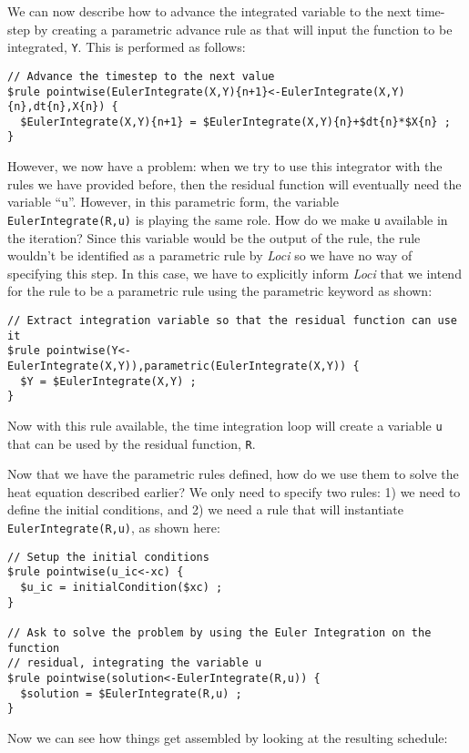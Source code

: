 \documentclass[10pt,epsf,letterpaper,twoside]{book}
\begin{document}
We can now describe how to advance the integrated variable to the next
time-step by creating a parametric advance rule as that will input the
function to be integrated, {\tt Y}.  This is performed as follows:
\begin{verbatim}
// Advance the timestep to the next value
$rule pointwise(EulerIntegrate(X,Y){n+1}<-EulerIntegrate(X,Y){n},dt{n},X{n}) {
  $EulerIntegrate(X,Y){n+1} = $EulerIntegrate(X,Y){n}+$dt{n}*$X{n} ;
}
\end{verbatim}

However, we now have a problem:  when we try to use this integrator
with the rules we have provided before, then the residual function
will eventually need the variable ``u''.  However, in this parametric
form, the variable {\tt EulerIntegrate(R,u)} is playing the same
role.  How do we make {\tt u} available in the iteration?  Since this
variable would be the output of the rule, the rule wouldn't be
identified as a parametric rule by {\it Loci} so we have no way of
specifying this step.  In this case, we have to explicitly inform {\it
  Loci} that we intend for the rule to be a parametric rule using the
parametric keyword as shown:
\begin{verbatim}
// Extract integration variable so that the residual function can use it
$rule pointwise(Y<-EulerIntegrate(X,Y)),parametric(EulerIntegrate(X,Y)) {
  $Y = $EulerIntegrate(X,Y) ;
}
\end{verbatim}
Now with this rule available, the time integration loop will create a
variable {\tt u} that can be used by the residual function, {\tt R}. 


Now that we have the parametric rules defined, how do we use them to
solve the heat equation described earlier?  We only need to specify
two rules:  1) we need to define the initial conditions, and 2) we
need a rule that will instantiate {\tt EulerIntegrate(R,u)}, as shown here:

\begin{verbatim}
// Setup the initial conditions
$rule pointwise(u_ic<-xc) {
  $u_ic = initialCondition($xc) ;
}

// Ask to solve the problem by using the Euler Integration on the function
// residual, integrating the variable u
$rule pointwise(solution<-EulerIntegrate(R,u)) {
  $solution = $EulerIntegrate(R,u) ;
}
\end{verbatim}

Now we can see how things get assembled by looking at the resulting schedule:
\end{document}
